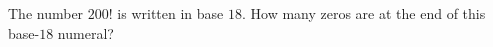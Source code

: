 The number $200!$ is written in base $18$. How many zeros are at the end of this base-$18$ numeral?
